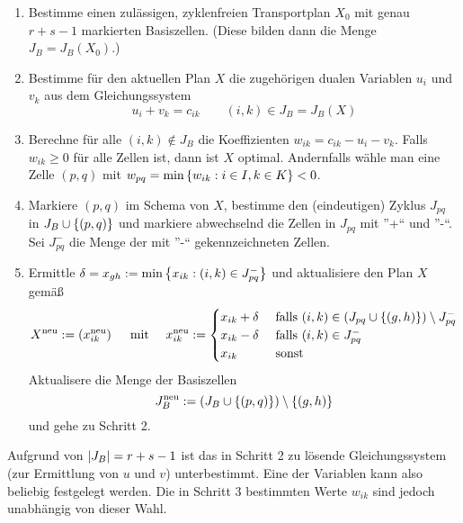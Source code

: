 \begin{enumerate}
	\item Bestimme einen zulässigen, zyklenfreien Transportplan $X_0$ mit genau $r+s-1$ markierten Basiszellen. (Diese bilden dann die Menge $J_B = J_B(X_0)$.)
	\item Bestimme für den aktuellen Plan $X$ die zugehörigen dualen Variablen $u_i$ und $v_k$ aus dem Gleichungssystem 
	\begin{equation}
		u_i + v_k = c_{ik} \qquad (i,k) \in J_B = J_B(X)
		\label{eq: 3.18}
	\end{equation}
	\item Berechne für alle $(i,k) \notin J_B$ die Koeffizienten $w_{ik} = c_{ik} - u_i - v_k$. Falls $w_{ik} \ge 0$ für alle Zellen ist, dann ist $X$ optimal. Andernfalls wähle man eine Zelle $(p,q)$ mit $w_{pq} = \min\left\{ w_{ik} : i \in I, k \in K \right\} < 0$.
	\item Markiere $(p,q)$ im Schema von $X$, bestimme den  (eindeutigen) Zyklus $J_{pq}$ in $J_B \cup \left\{ (p,q) \right\}$ und markiere abwechselnd die Zellen in $J_{pq}$ mit ''+`` und ''-``. Sei $J_{pq}^-$ die Menge der mit ''-`` gekennzeichneten Zellen.
	\item Ermittle $\delta = x_{gh} \mathrel{:=} \min\left\{ x_{ik} : (i,k) \in J_{pq}^- \right\}$ und aktualisiere den Plan $X$ gemäß
	\begin{equation*}
		X^{\text{neu}} \mathrel{:=} \left( x_{ik}^{\text{neu}} \right) \quad \text{ mit } \quad  
		x_{ik}^{\text{neu}} \mathrel{:=} \begin{cases}
		x_{ik} + \delta & \text{ falls }(i,k) \in \left( J_{pq} \cup \left\{ (g,h) \right\} \right) \setminus J_{pq}^-\\
		x_{ik} - \delta & \text{ falls }(i,k) \in J_{pq}^-\\
		x_{ik} & \text{ sonst}
		\end{cases}
	\end{equation*}
	Aktualisere die Menge der Basiszellen
	\begin{equation*}
		J_B^{\text{neu}} \mathrel{:=} \left( J_B \cup \left\{ (p,q) \right\} \right) \setminus \left\{ (g,h) \right\}
	\end{equation*}
	und gehe zu Schritt 2.
\end{enumerate}

\begin{bemerkung} %
	Aufgrund von $\left| J_B \right| = r + s - 1$ ist das in Schritt 2 zu lösende Gleichungssystem (zur Ermittlung von $u$ und $v$) unterbestimmt. Eine der Variablen kann also beliebig festgelegt werden. Die in Schritt 3 bestimmten Werte $w_{ik}$ sind jedoch unabhängig von dieser Wahl.
\end{bemerkung}

